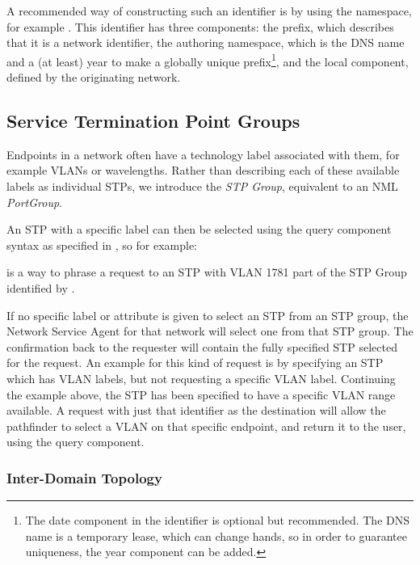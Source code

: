 \documentclass[12pt]{article}  %
\begin{document}
A recommended way of constructing such an identifier is by using 
the  namespace\cite{GFD.202}, for example .
This identifier has three components: the prefix,  
which describes that it is a network identifier, the authoring namespace,  
which is the DNS name and a (at least) year to make a globally unique prefix\footnote{  
The date component in the identifier is optional but recommended. The DNS name 
is a temporary lease, which can change hands, so in order to guarantee uniqueness, 
the year component can be added.}, and the local component,  defined by the originating 
network.


\subsection{Service Termination Point Groups}

Endpoints in a network often have a technology label associated 
with them, for example VLANs or wavelengths. Rather than describing each of these 
available labels as individual STPs, we introduce the \emph{STP Group}, equivalent to 
an NML \emph{PortGroup}.

An STP with a specific label can then be selected using the query 
component syntax as specified in \cite{rfc3986}, so for example:

 is a way to phrase 
a request to an STP with VLAN 1781 part of the STP Group identified by 
.


If no specific label or attribute is given to select an STP from 
an STP group, the Network Service Agent for that network will select one from that STP group. The 
confirmation back to the requester will contain the fully specified STP selected 
for the request. An example for this kind of request is by specifying an STP which 
has VLAN labels, but not requesting a specific VLAN label. Continuing the example 
above, the STP  has been specified to have a 
specific VLAN range available. A request with just that identifier as the destination 
will allow the pathfinder to select a VLAN on that specific endpoint, and return 
it to the user, using the query component.

\subsubsection{Inter-Domain Topology} %
\label{ssub:interdomain_topology}
\end{document}
